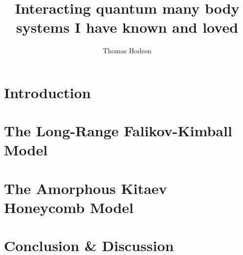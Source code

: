 \documentclass[a4paper,12pt]{report}
\begin{document}
\title{\LARGE {\bf Interacting quantum many body systems I have known and loved}\\
 \vspace*{6mm}
}

\author{Thomas Hodson}

\normallinespacing
\maketitle

\preface




% 

\body
\chapter{Introduction}


\chapter{The Long-Range Falikov-Kimball Model}


\chapter{The Amorphous Kitaev Honeycomb Model}




\chapter{Conclusion \& Discussion}
\appendix
    

\printbibliography
\end{document}
